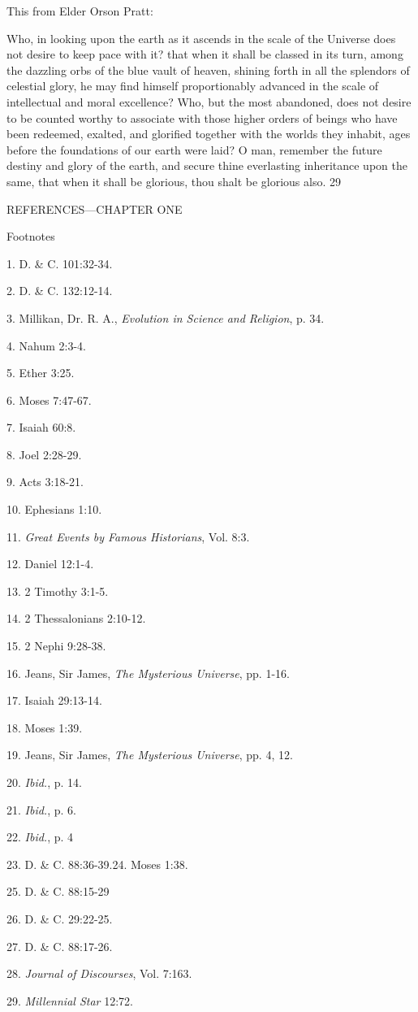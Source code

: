 This from Elder Orson Pratt:

Who, in looking upon the earth as it ascends in the scale of the Universe does not desire to
keep pace with it? that when it shall be classed in its turn, among the dazzling orbs of the
blue vault of heaven, shining forth in all the splendors of celestial glory, he may find himself
proportionably advanced in the scale of intellectual and moral excellence? Who, but the most
abandoned, does not desire to be counted worthy to associate with those higher orders of
beings who have been redeemed, exalted, and glorified together with the worlds they inhabit,
ages before the foundations of our earth were laid? O man, remember the future destiny and
glory of the earth, and secure thine everlasting inheritance upon the same, that when it shall
be glorious, thou shalt be glorious also. 29

\newpage
REFERENCES—CHAPTER ONE

Footnotes

1. D. \& C. 101:32-34.

2. D. \& C. 132:12-14.

3. Millikan, Dr. R. A., \textit{Evolution in Science and Religion}, p. 34.

4. Nahum 2:3-4.

5. Ether 3:25.

6. Moses 7:47-67.

7. Isaiah 60:8.

8. Joel 2:28-29.

9. Acts 3:18-21.

10. Ephesians 1:10.

11. \textit{Great Events by Famous Historians}, Vol. 8:3.

12. Daniel 12:1-4.

13. 2 Timothy 3:1-5.

14. 2 Thessalonians 2:10-12.

15. 2 Nephi 9:28-38.

16. Jeans, Sir James, \textit{The Mysterious Universe}, pp. 1-16.

17. Isaiah 29:13-14.

18. Moses 1:39.

19. Jeans, Sir James, \textit{The Mysterious Universe}, pp. 4, 12.

20. \textit{Ibid.}, p. 14.

21. \textit{Ibid.}, p. 6.

22. \textit{Ibid.}, p. 4

23. D. \& C. 88:36-39.24. Moses 1:38.

25. D. \& C. 88:15-29

26. D. \& C. 29:22-25.

27. D. \& C. 88:17-26.

28. \textit{Journal of Discourses}, Vol. 7:163.

29. \textit{Millennial Star} 12:72.

